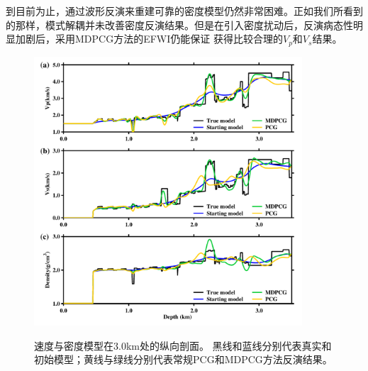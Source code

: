 到目前为止，通过波形反演来重建可靠的密度模型仍然非常困难。正如我们所看到的那样，模式解耦并未改善密度反演结果。但是在引入密度扰动后，反演病态性明显加剧后，采用MDPCG方法的EFWI仍能保证
获得比较合理的$V_p$和$V_s$结果。
\begin{figure}[!htb]
    \begin{center}
        {\includegraphics[width=10cm]{Figure/chapter02/tariqsugresult/Fig/3kmrho.pdf}}
        \caption{
			速度与密度模型在3.0km处的纵向剖面。
			黑线和蓝线分别代表真实和初始模型；黄线与绿线分别代表常规PCG和MDPCG方法反演结果。
    }
    \label{fig:RhoProfile3km}
    \end{center}
\end{figure}
